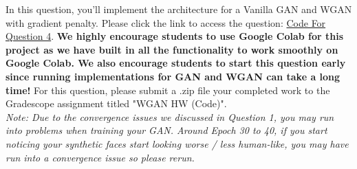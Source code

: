  \newline

In this question, you’ll implement the architecture for a Vanilla GAN and WGAN with gradient penalty. Please click the link to access the question: \href{https://drive.google.com/drive/folders/1N0JSBAgoGtbzgxn6p1Z1MlQuZb5Tph9U?usp=sharing}{Code For Question 4}. \textbf{We highly encourage students to use Google Colab for this project as we have built in all the functionality to work smoothly on Google Colab. We also encourage students to start this question early since running implementations for GAN and WGAN can take a long time!} For this question, please submit a .zip file your completed work to the Gradescope assignment titled "WGAN HW (Code)". \\
\textit{Note: Due to the convergence issues we discussed in Question 1, you may run into problems when training your GAN. Around Epoch 30 to 40, if you start noticing your synthetic faces start looking worse / less human-like, you may have run into a convergence issue so please rerun.}

\begin{enumerate}
    
    
    


    
\end{enumerate}
